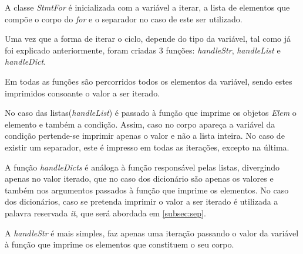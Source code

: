 \documentclass[../relatorio.tex]{subfiles}
\begin{document}
    A classe \textit{StmtFor} é inicializada com a variável a iterar, a lista
    de elementos que compõe o corpo do \textit{for} e o separador no caso de
    este ser utilizado.

    Uma vez que a forma de iterar o ciclo, depende do tipo da variável, tal como
    já foi explicado anteriormente, foram criadas 3 funções: \textit{handleStr},
    \textit{handleList} e \textit{handleDict}. 

    Em todas as funções são percorridos todos os elementos da variável, sendo estes imprimidos
    consoante o valor a ser iterado. 

    
    No caso das listas(\textit{handleList}) é passado à função que imprime os objetos \textit{Elem} o elemento e também a condição.
    Assim, caso no corpo apareça a variável da condição pertende-se imprimir
    apenas o valor e não a lista inteira. No caso de existir um separador, este é
    impresso em todas as iterações, excepto na última. 

    A função \textit{handleDicts} é análoga à função responsável pelas listas, divergindo
    apenas no valor iterado, que no caso dos dicionário são apenas os valores e também nos
    argumentos passados à função que imprime os elementos. No caso dos dicionários, caso se
    pretenda imprimir o valor a ser iterado é utilizada a palavra reservada \textit{it}, que
    será abordada em \ref{subsec:sep}. 

    A \textit{handleStr} é mais simples, faz apenas uma iteração passando o valor da variável 
    à função que imprime os elementos que constituem o seu corpo.
\end{document}
